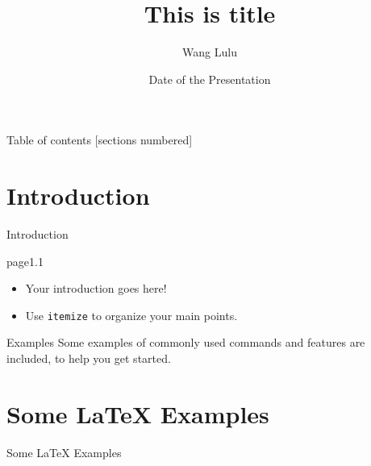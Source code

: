 \documentclass{beamer}
\title[Your Short Title]{This is title}
\author{Wang Lulu}
\institute{Peking University}
\date{Date of the Presentation}
\begin{document}
\begin{frame}
  \titlepage
\end{frame}



\begin{frame}{Table of contents}
  [sections numbered]
  \tableofcontents[hideallsubsections]
\end{frame}



\section{Introduction}

\begin{frame}
	\begin{center}
		\item Introduction
	\end{center}
\end{frame}


\begin{frame}{page1.1}

\begin{itemize}
  \item Your introduction goes here!
  \item Use \texttt{itemize} to organize your main points.
\end{itemize}

\vskip 1cm

\begin{block}{Examples}
Some examples of commonly used commands and features are included, to help you get started.
\end{block}

\end{frame}



\section{Some \LaTeX{} Examples}

\begin{frame}
	\begin{center}
		\item Some \LaTeX{} Examples
	\end{center}
\end{frame}
\end{document}
